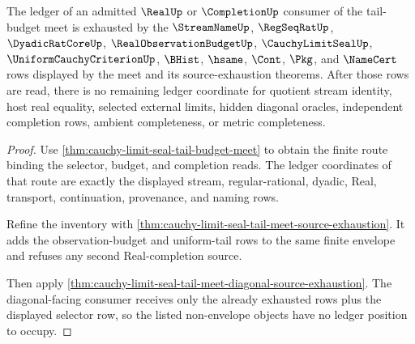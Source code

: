 \begin{theorem}
\label{thm:cauchy-limit-seal-tail-budget-meet-ledger-exhaustion}
The ledger of an admitted $\RealUp$ or $\CompletionUp$ consumer of the tail-budget meet is exhausted by the $\StreamNameUp$, $\RegSeqRatUp$, $\DyadicRatCoreUp$, $\RealObservationBudgetUp$, $\CauchyLimitSealUp$, $\UniformCauchyCriterionUp$, $\BHist$, $\hsame$, $\Cont$, $\Pkg$, and $\NameCert$ rows displayed by the meet and its source-exhaustion theorems. After those rows are read, there is no remaining ledger coordinate for quotient stream identity, host real equality, selected external limits, hidden diagonal oracles, independent completion rows, ambient completeness, or metric completeness.
\end{theorem}
\begin{proof}
Use \autoref{thm:cauchy-limit-seal-tail-budget-meet} to obtain the finite route binding the selector, budget, and completion reads. The ledger coordinates of that route are exactly the displayed stream, regular-rational, dyadic, Real, transport, continuation, provenance, and naming rows.

Refine the inventory with \autoref{thm:cauchy-limit-seal-tail-meet-source-exhaustion}. It adds the observation-budget and uniform-tail rows to the same finite envelope and refuses any second Real-completion source.

Then apply \autoref{thm:cauchy-limit-seal-tail-meet-diagonal-source-exhaustion}. The diagonal-facing consumer receives only the already exhausted rows plus the displayed selector row, so the listed non-envelope objects have no ledger position to occupy.
\end{proof}

